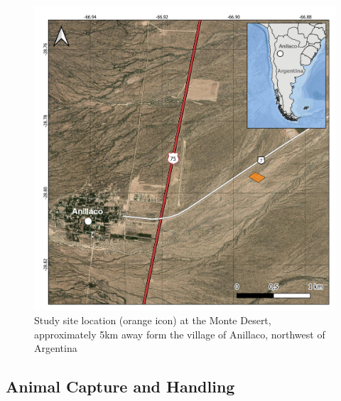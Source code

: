 \documentclass[english,msc,numbers,hidelinks]{coppe}
\begin{document}
  \begin{figure}

  {\centering \includegraphics[width=1\linewidth]{../04_figures/map/tuco_map} 

  }

  \caption{Study site location (orange icon) at the Monte Desert, approximately 5km away form the village of Anillaco, northwest of Argentina}\label{fig:methods-map}
  \end{figure}
  \hypertarget{animal-capture-and-handling}{%
  \subsection{Animal Capture and Handling}\label{animal-capture-and-handling}}
\end{document}
